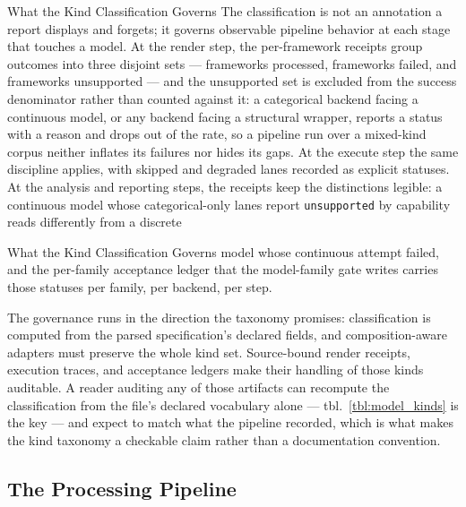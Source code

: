 \documentclass[
  ignorenonframetext,
]{beamer}
\begin{document}
\begin{frame}{What the Kind Classification
Governs}
\protect{}\label{what-the-kind-classification-governs}
The classification is not an annotation a report displays and forgets;
it governs observable pipeline behavior at each stage that touches a
model. At the render step, the per-framework receipts group outcomes
into three disjoint sets --- frameworks processed, frameworks failed,
and frameworks unsupported --- and the unsupported set is excluded from
the success denominator rather than counted against it: a categorical
backend facing a continuous model, or any backend facing a structural
wrapper, reports a status with a reason and drops out of the rate, so a
pipeline run over a mixed-kind corpus neither inflates its failures nor
hides its gaps. At the execute step the same discipline applies, with
skipped and degraded lanes recorded as explicit statuses. At the
analysis and reporting steps, the receipts keep the distinctions
legible: a continuous model whose categorical-only lanes report
\texttt{unsupported} by capability reads differently from a discrete
\end{frame}

\begin{frame}{What the Kind Classification
Governs}
model whose continuous attempt failed, and the per-family acceptance
ledger that the model-family gate writes carries those statuses per
family, per backend, per step.

The governance runs in the direction the taxonomy promises:
classification is computed from the parsed specification's declared
fields, and composition-aware adapters must preserve the whole kind set.
Source-bound render receipts, execution traces, and acceptance ledgers
make their handling of those kinds auditable. A reader auditing any of
those artifacts can recompute the classification from the file's
declared vocabulary alone --- tbl.~\ref{tbl:model_kinds} is the key ---
and expect to match what the pipeline recorded, which is what makes the
kind taxonomy a checkable claim rather than a documentation convention.
\end{frame}

\subsection{The Processing Pipeline}\label{the-processing-pipeline}
\end{document}
